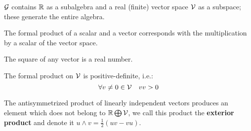 \begin{axiom}\label{a:ga-axiom1}
    $\mathcal{G}$ contains $\mathbb{R}$ as a subalgebra and a real (finite) vector space $\mathcal{V}$ as a subspace; these generate the entire algebra.
\end{axiom}

\begin{axiom}\label{a:ga-axiom2}
	The formal product of a scalar and a vector corresponds with the multiplication by a scalar of the vector space.
\end{axiom}

\begin{axiom}\label{a:ga-axiom3}
    The square of any vector is a real number.
\end{axiom}

\begin{axiom}\label{a:ga-axiom4}
	The formal product on $\mathcal{V}$ is positive-definite, i.e.:
\[\forall v \neq 0 \in \mathcal{V} \quad vv > 0\]
\end{axiom}

\begin{axiom}\label{a:ga-axiom5}
	The antisymmetrized product of linearly independent vectors	produces an element which does not belong to $\mathbb{R} \bigoplus \mathcal{V}$, we call this product the \textbf{exterior product} and denote it $u \wedge v = \frac{1}{2} (uv - vu)$. 
\end{axiom}
